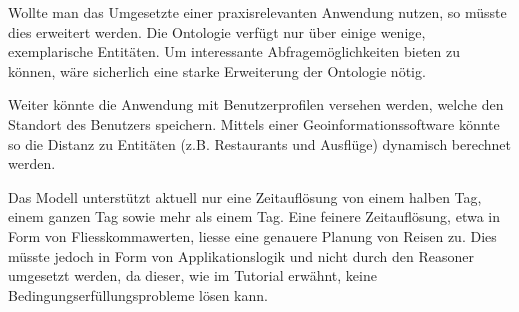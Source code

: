 Wollte man das Umgesetzte einer praxisrelevanten Anwendung nutzen, so müsste dies erweitert werden. Die Ontologie verfügt nur über einige wenige, exemplarische Entitäten. Um interessante Abfragemöglichkeiten bieten zu können, wäre sicherlich eine starke Erweiterung der Ontologie nötig.

Weiter könnte die Anwendung mit Benutzerprofilen versehen werden, welche den Standort des Benutzers speichern. Mittels einer Geoinformationssoftware könnte so die Distanz zu Entitäten (z.B. Restaurants und Ausflüge) dynamisch berechnet werden.

Das Modell unterstützt aktuell nur eine Zeitauflösung von einem halben Tag, einem ganzen Tag sowie mehr als einem Tag. Eine feinere Zeitauflösung, etwa in Form von Fliesskommawerten, liesse eine genauere Planung von Reisen zu. Dies müsste jedoch in Form von Applikationslogik und nicht durch den Reasoner umgesetzt werden, da dieser, wie im Tutorial erwähnt, keine Bedingungserfüllungsprobleme lösen kann.





